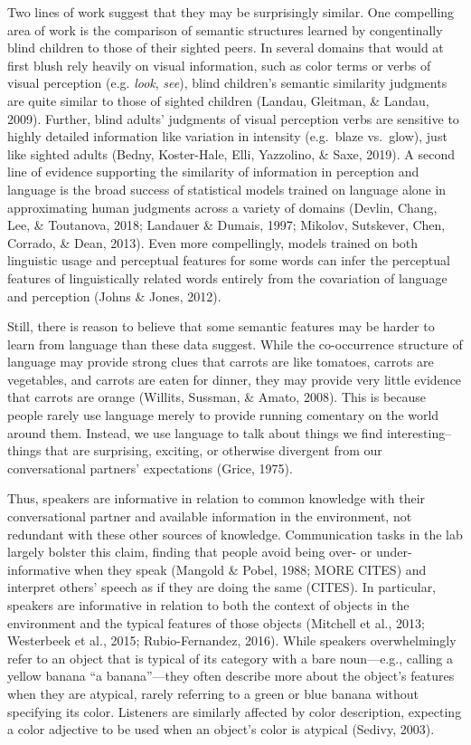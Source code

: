 \documentclass[10pt, letterpaper]{article}
\begin{document}
Two lines of work suggest that they may be surprisingly similar. One
compelling area of work is the comparison of semantic structures learned
by congentinally blind children to those of their sighted peers. In
several domains that would at first blush rely heavily on visual
information, such as color terms or verbs of visual perception (e.g.
\emph{look}, \emph{see}), blind children's semantic similarity judgments
are quite similar to those of sighted children (Landau, Gleitman, \&
Landau, 2009). Further, blind adults' judgments of visual perception
verbs are sensitive to highly detailed information like variation in
intensity (e.g.~blaze vs.~glow), just like sighted adults (Bedny,
Koster-Hale, Elli, Yazzolino, \& Saxe, 2019). A second line of evidence
supporting the similarity of information in perception and language is
the broad success of statistical models trained on language alone in
approximating human judgments across a variety of domains (Devlin,
Chang, Lee, \& Toutanova, 2018; Landauer \& Dumais, 1997; Mikolov,
Sutskever, Chen, Corrado, \& Dean, 2013). Even more compellingly, models
trained on both linguistic usage and perceptual features for some words
can infer the perceptual features of linguistically related words
entirely from the covariation of language and perception (Johns \&
Jones, 2012).

Still, there is reason to believe that some semantic features may be
harder to learn from language than these data suggest. While the
co-occurrence structure of language may provide strong clues that
carrots are like tomatoes, carrots are vegetables, and carrots are eaten
for dinner, they may provide very little evidence that carrots are
orange (Willits, Sussman, \& Amato, 2008). This is because people rarely
use language merely to provide running comentary on the world around
them. Instead, we use language to talk about things we find
interesting--things that are surprising, exciting, or otherwise
divergent from our conversational partners' expectations (Grice, 1975).

Thus, speakers are informative in relation to common knowledge with
their conversational partner and available information in the
environment, not redundant with these other sources of knowledge.
Communication tasks in the lab largely bolster this claim, finding that
people avoid being over- or under-informative when they speak (Mangold
\& Pobel, 1988; MORE CITES) and interpret others' speech as if they are
doing the same (CITES). In particular, speakers are informative in
relation to both the context of objects in the environment and the
typical features of those objects (Mitchell et al., 2013; Westerbeek et
al., 2015; Rubio-Fernandez, 2016). While speakers overwhelmingly refer
to an object that is typical of its category with a bare noun---e.g.,
calling a yellow banana ``a banana''---they often describe more about
the object's features when they are atypical, rarely referring to a
green or blue banana without specifying its color. Listeners are
similarly affected by color description, expecting a color adjective to
be used when an object's color is atypical (Sedivy, 2003).
\end{document}
